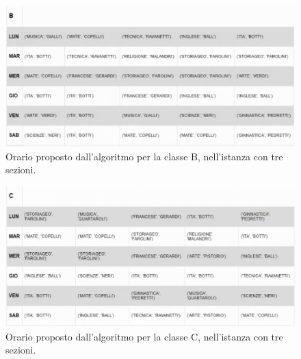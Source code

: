 \documentclass{article}
\begin{document}
\begin{figure}[H]
  \begin{center}
  \advance\leftskip-1cm
    \includegraphics[width=\columnwidth]{Classe B 3.png}
  \end{center}
  \caption[Risultato AMPL]{Orario proposto dall'algoritmo per la classe B, nell'istanza con tre sezioni.}
  \label{fig:Risultato AMPL B_3}
\end{figure}

\begin{figure}[H]
  \begin{center}
  \advance\leftskip-1cm
    \includegraphics[width=\columnwidth]{Classe C 3.png}
  \end{center}
  \caption[Risultato AMPL]{Orario proposto dall'algoritmo per la classe C, nell'istanza con tre sezioni.}
  \label{fig:Risultato AMPL C_3}
\end{figure}
\end{document}
